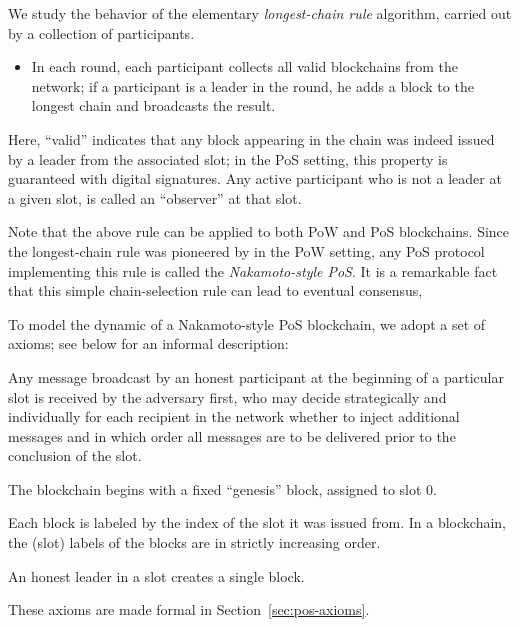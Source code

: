 We study the behavior of the elementary \emph{longest-chain rule}
algorithm, carried out by a collection of participants. 
\begin{itemize}
  \item In each round,
  each participant collects all valid blockchains from the network; if a
  participant is a leader in the round, he adds a block to the longest
  chain and broadcasts the result.
\end{itemize}
Here, ``valid'' indicates that any block appearing in the
chain was indeed issued by a leader from the associated slot; in the
PoS setting, this property is guaranteed with digital
signatures.
Any active participant who is not a leader at a given slot, 
is called an ``observer'' at that slot.

Note that the above rule can be applied to both PoW and PoS blockchains. 
Since the longest-chain rule was pioneered by \citet{Nakamoto} in the PoW setting, 
any PoS protocol implementing this rule is called the \emph{Nakamoto-style PoS}.
It is a remarkable fact that this simple chain-selection rule 
can lead to eventual consensus, 




To model the dynamic of a Nakamoto-style PoS blockchain, 
we adopt a set of axioms; see below for an informal description:

\begin{description}[font=\normalfont\itshape\space]
  \item[Message delivery.] 
    Any message broadcast by an honest participant at the beginning of a
    particular slot is received by the adversary first, who may decide
    strategically and individually for each recipient in the network
    whether to inject additional messages and in which order all messages
    are to be delivered prior to the conclusion of the slot. 

  \item[Genesis block.]
  The blockchain begins with a fixed ``genesis'' block, assigned to slot $0$.
  
  \item[Block monotonicity] 
  Each block is labeled by the index of the slot it was issued from. 
  In a blockchain, the (slot) labels of the blocks are in strictly increasing order.

  \item[Honest blocks.] 
  An honest leader in a slot creates a single block.
\end{description}
These axioms are made formal in Section~\ref{sec:pos-axioms}.






